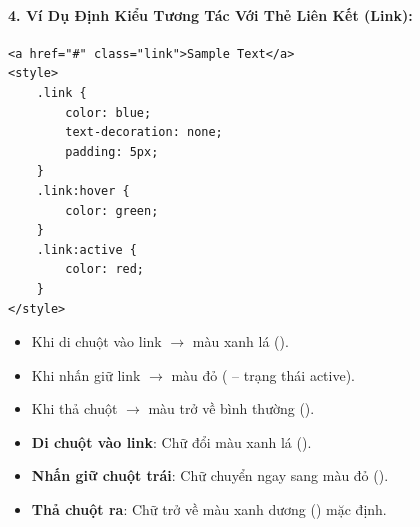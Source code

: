 \paragraph{4. Ví Dụ Định Kiểu Tương Tác Với Thẻ Liên Kết (Link):}

\begin{codeWindow}
\begin{lstlisting}[language=HTML5]
<a href="#" class="link">Sample Text</a>
<style>
    .link {
        color: blue;
        text-decoration: none;
        padding: 5px;
    }
    .link:hover {
        color: green;
    }
    .link:active {
        color: red;
    }
</style>
\end{lstlisting}
\end{codeWindow}

\begin{conceptBox}
\begin{itemize}[leftmargin=1.5em, itemsep=2pt, parsep=0pt]
    \item Khi di chuột vào link $\rightarrow$ màu xanh lá ().
    \item Khi nhấn giữ link $\rightarrow$ màu đỏ ( -- trạng thái active).
    \item Khi thả chuột $\rightarrow$ màu trở về bình thường ().
\end{itemize}
\end{conceptBox}

\begin{browserWindow}
\begin{itemize}[leftmargin=1.5em, itemsep=3pt, parsep=0pt]
    \item \textbf{Di chuột vào link}: Chữ đổi màu xanh lá ().
    \item \textbf{Nhấn giữ chuột trái}: Chữ chuyển ngay sang màu đỏ ().
    \item \textbf{Thả chuột ra}: Chữ trở về màu xanh dương () mặc định.
\end{itemize}
\end{browserWindow}

